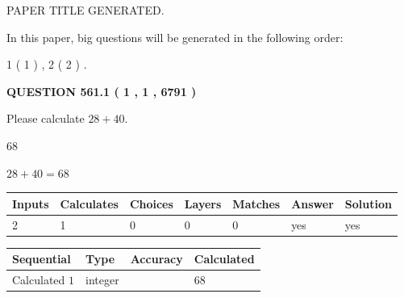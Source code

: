 \documentclass[12pt]{article}
\begin{document}
 
 
 
   
   
 PAPER TITLE GENERATED.
   
   
   
\vspace{0.2in}
   
In this paper, big questions will be generated in the following order: 
   
   
   1 ( 1 )
 ,
   2 ( 2 )
 .
  
\vspace{0.2in}
  
{\textbf{\Large{QUESTION
561.1 
 ( 1 , 1 , 6791 )
}}}
  
  
 
Please calculate $ %
28 +  %
40 $.
 
 
 
\noindent{}
 
 

68
 
 
\noindent{}
 
 

 
 
 
\noindent{}
 
 

$ %
28 +  %
40=   %
68$
 
 
\noindent{}
 
 

 
   
   
   
   
\noindent\begin{tabular}{|l|l|l|l|l|l|l|}
 \hline
Inputs & Calculates & Choices & Layers & Matches & Answer & Solution \\ \hline
 2  & 
 1  & 
 0
  & 
 0  & 
 0  & 
  yes & 
  yes 
  \\ \hline
 \end{tabular}
   
   
   
   
\noindent{}
   
   
  
  
\noindent\begin{tabular}{|l|l|l|l|}
\hline
 Sequential & Type & Accuracy & Calculated \\ 
\hline
 
 
  Calculated $  1 $ & integer &  & 
  $ 68 $ 
 \\  \hline  
 \end{tabular}
   
\end{document}
